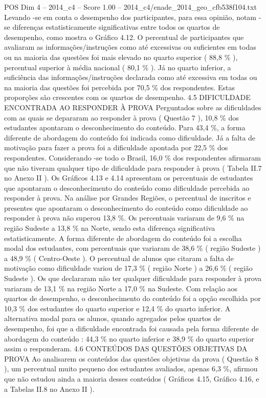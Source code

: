 \begin{textsample}{POS Dim 4 – 2014\_c4 – Score 1.00 – 2014\_c4/enade\_2014\_geo\_cfb538f104.txt}
Levando -se em conta o desempenho dos participantes, para essa opinião, notam -se diferenças estatisticamente significativas entre todos os quartos de desempenho, como mostra o Gráfico 4.12.
O percentual de participantes que avaliaram as informações/instruções como até excessivas ou suficientes em todas ou na maioria das questões foi mais elevado no quarto superior ( 88,8 \% ), percentual superior à média nacional ( 80,1 \% ).
Já no quarto inferior, a suficiência das informações/instruções declarada como até excessiva em todas ou na maioria das questões foi percebida por 70,5 \% dos respondentes.
Estas proporções são crescentes com os quartos de desempenho. 4.5 DIFICULDADE ENCONTRADA AO RESPONDER À PROVA Perguntados sobre as dificuldades com as quais se depararam ao responder à prova ( Questão 7 ), 10,8 \% dos estudantes apontaram o desconhecimento do conteúdo.
Para 43,4 \%, a forma diferente de abordagem do conteúdo foi indicada como dificuldade.
Já a falta de motivação para fazer a prova foi a dificuldade apontada por 22,5 \% dos respondentes.
Considerando -se todo o Brasil, 16,0 \% dos respondentes afirmaram que não tiveram qualquer tipo de dificuldade para responder à prova ( Tabela II.7 no Anexo II ).
Os Gráficos 4.13 e 4.14 apresentam os percentuais de estudantes que apontaram o desconhecimento do conteúdo como dificuldade percebida ao responder à prova.
Na análise por Grandes Regiões, o percentual de inscritos e presentes que apontaram o desconhecimento do conteúdo como dificuldade ao responder à prova não superou 13,8 \%.
Os percentuais variaram de 9,6 \% na região Sudeste a 13,8 \% na Norte, sendo esta diferença significativa estatisticamente.
A forma diferente de abordagem do conteúdo foi a escolha modal dos estudantes, com percentuais que variaram de 38,6 \% ( região Sudeste ) a 48,9 \% ( Centro-Oeste ).
O percentual de alunos que citaram a falta de motivação como dificuldade variou de 17,3 \% ( região Norte ) a 26,6 \% ( região Sudeste ).
Os que declararam não ter qualquer dificuldade para responder à prova variaram de 13,1 \% na região Norte a 17,0 \% na Sudeste.
Com relação aos quartos de desempenho, o desconhecimento do conteúdo foi a opção escolhida por 10,3 \% dos estudantes do quarto superior e 12,4 \% do quarto inferior.
A alternativa modal para os alunos, quando agregados pelos quartos de desempenho, foi que a dificuldade encontrada foi causada pela forma diferente de abordagem do conteúdo : 44,3 \% no quarto inferior e 38,9 \% do quarto superior assim o responderam. 4.6 CONTEÚDOS DAS QUESTÕES OBJETIVAS DA PROVA Ao analisarem os conteúdos das questões objetivas da prova ( Questão 8 ), um percentual muito pequeno dos estudantes avaliados, apenas 6,3 \%, afirmou que não estudou ainda a maioria desses conteúdos ( Gráficos 4.15, Gráfico 4.16, e a Tabelas II.8 no Anexo II ).

\end{textsample}
